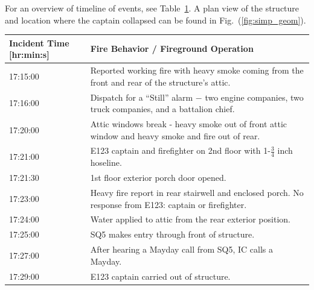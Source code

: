 \documentclass[11pt,oneside]{book}
\begin{document}
\noindent For an overview of timeline of events, see Table~\ref{tab:fire_info}. A plan view of the structure and location where the captain collapsed can be found in Fig.~(\ref{fig:simp_geom}).
\begin{table}
\centering
{}\label{tab:fire_info}
\begin{tabular}{l l}
\toprule[1.5pt]
Incident Time [hr:min:s] & Fire Behavior / Fireground Operation  \\
\midrule
\multirow{2}{*}{17:15:00} & \multirow{2}{*}{\parbox{10cm} {Reported working fire with heavy smoke coming from the front and rear of the structure's attic.}} \\ 
         & \\[.25cm] %
\multirow{2}{*}{17:16:00}    &  \multirow{2}{*}{\parbox{10cm} {Dispatch for a ``Still'' alarm $-$ two engine companies, two truck companies, and a battalion chief.}} \\
         & \\[.25cm]
\multirow{2}{*}{17:20:00}    & \multirow{2}{*}{\parbox{10cm} {Attic windows break - heavy smoke out of front attic window and heavy smoke and fire out of rear.}} \\
         & \\[.25cm] 
17:21:00 & E123 captain and firefighter on 2nd floor with 1-$\tfrac{3}{4}$ inch hoseline. \\[.25cm]
17:21:30 & 1st floor exterior porch door opened. \\[.25cm]
\multirow{2}{*}{17:23:00}    & \multirow{2}{*}{\parbox{10cm} {Heavy fire report in rear stairwell and enclosed porch. No response from E123: captain or firefighter.}} \\
         & \\[.25cm]
17:24:00    & Water applied to attic from the rear exterior position. \\[.25cm]
17:25:00    & SQ5 makes entry through front of structure. \\[.25cm]
17:27:00    & After hearing a Mayday call from SQ5, IC calls a Mayday. \\[.25cm]
17:29:00    & E123 captain carried out of structure. \\
\bottomrule[1.25pt]
\end{tabular}\par
\end{table}
 
\end{document}
